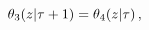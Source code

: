 \[\mathop{\theta_{3}\/}\nolimits\!\left(z\middle|\tau+1\right)=\mathop{\theta_{4%
}\/}\nolimits\!\left(z\middle|\tau\right),\]